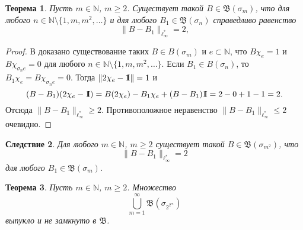 \documentclass[12pt]{article}
\newcommand{\emm}{\mathrm{1\hspace{-0.3em} I}}
\newtheorem{thm}{Теорема}
\newtheorem{cor}[thm]{Следствие}
\def\N{{\mathbb{N}}}
\def\B{{\mathfrak{B}}}
\begin{document}
\begin{thm}
Пусть $m\in \N$, $m\ge2$. Существует такой $B\in \B(\sigma_m)$, что для любого $n\in \N\setminus\{1, m, m^2,\dots\}$ и для любого $B_1\in \B(\sigma_n)$ справедливо равенство
\begin{equation*}\label{dl3}
\|B-B_1\|_{\ell_\infty^*}=2,
\end{equation*}
\end{thm}

\begin{proof}
В \cite[Tеорема 9]{ASSU2} доказано существование таких $B\in B(\sigma_m)$ и $e\subset \N$, что $B\chi_e =1$ и $B\chi_{\sigma_ne} =0$ для любого $n\in\N\setminus \{1, m, m^2, \dots\}$. Если $B_1\in B(\sigma_n)$, то $B_1\chi_e =B\chi_{\sigma_ne} =0$. Тогда $\|2\chi_e-\emm\|=1$ и
$$(B-B_1)(2\chi_e-\emm)=B(2\chi_e)-B_1\chi_e+(B-B_1)\emm=2-0+1-1=2.$$
Отсюда $\|B-B_1\|_{\ell_\infty^*}\ge2$. Противоположное неравенство $\|B-B_1\|_{\ell_\infty^*}\le2$ очевидно.
\end{proof}

\begin{cor}\label{dl_cor}
Для любого $m\in \N$, $m\ge2$ существует такой $B\in \B(\sigma_{m^2})$, что
$$\|B-B_1\|_{\ell_\infty^*}=2 $$
 для любого $B_1\in \B(\sigma_m)$.
\end{cor}

\begin{thm}
Пусть $m\in \N$, $m\ge2$. Множество
\begin{equation}\label{dl4}
\bigcup_{m=1}^\infty\mathfrak B(\sigma_{2^{2^m}})
\end{equation}
выпукло и не замкнуто в $\B$.
\end{thm}
\end{document}
